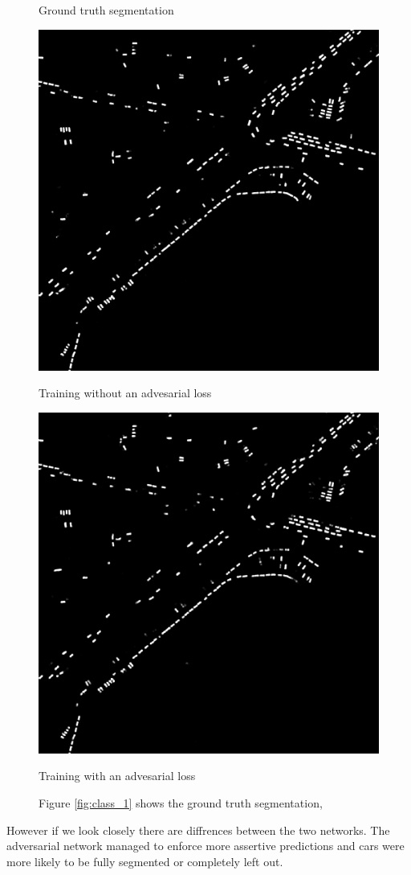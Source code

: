 \documentclass[a4paper,11pt]{article}
\begin{document}
\begin{figure}[H]
  \caption{Ground truth segmentation}\label{fig:label_1}
\endminipage\hfill
{}
  \includegraphics[width=\linewidth]{gan_vs_class/class_4}
  \caption{Training without an advesarial loss}\label{fig:class_1}
\endminipage\hfill
{}%
  \includegraphics[width=\linewidth]{gan_vs_class/gan_4}
  \caption{Training with an advesarial loss}\label{fig:label_2}
\endminipage
\caption{Figure \ref{fig:class_1} shows the ground truth segmentation,}
\end{figure}
However if we look closely there are diffrences between the two networks. The adversarial network managed to enforce more assertive predictions and cars were more likely to be fully segmented or completely left out.
\end{document}
